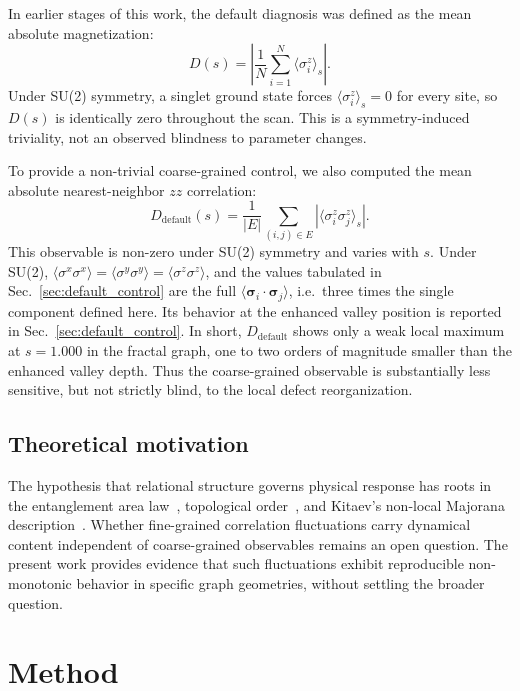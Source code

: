 \documentclass[pdflatex,sn-mathphys-num,iicol]{sn-jnl}
\begin{document}
In earlier stages of this work, the default diagnosis was defined as the mean absolute magnetization:
\begin{equation}
D(s)=\left|\frac{1}{N}\sum_{i=1}^N\langle\sigma_i^z\rangle_s\right|.
\end{equation}
Under SU(2) symmetry, a singlet ground state forces $\langle\sigma_i^z\rangle_s=0$ for every site, so $D(s)$ is identically zero throughout the scan. This is a symmetry-induced triviality, not an observed blindness to parameter changes.

To provide a non-trivial coarse-grained control, we also computed the mean absolute nearest-neighbor $zz$ correlation:
\begin{equation}
D_{\text{default}}(s)=\frac{1}{|E|}\sum_{(i,j)\in E}\left|\langle\sigma_i^z\sigma_j^z\rangle_s\right|.
\end{equation}
This observable is non-zero under SU(2) symmetry and varies with $s$. Under SU(2), $\langle\sigma^x\sigma^x\rangle=\langle\sigma^y\sigma^y\rangle=\langle\sigma^z\sigma^z\rangle$, and the values tabulated in Sec.~\ref{sec:default_control} are the full $\langle\boldsymbol{\sigma}_i\cdot\boldsymbol{\sigma}_j\rangle$, i.e.\ three times the single component defined here. Its behavior at the enhanced valley position is reported in Sec.~\ref{sec:default_control}. In short, $D_{\text{default}}$ shows only a weak local maximum at $s=1.000$ in the fractal graph, one to two orders of magnitude smaller than the enhanced valley depth. Thus the coarse-grained observable is substantially less sensitive, but not strictly blind, to the local defect reorganization.

\subsection{Theoretical motivation}

The hypothesis that relational structure governs physical response has roots in the entanglement area law~\cite{Eisert2010}, topological order~\cite{Wen2017}, and Kitaev's non-local Majorana description~\cite{Kitaev2001}. Whether fine-grained correlation fluctuations carry dynamical content independent of coarse-grained observables remains an open question. The present work provides evidence that such fluctuations exhibit reproducible non-monotonic behavior in specific graph geometries, without settling the broader question.

\section{Method}
\end{document}
